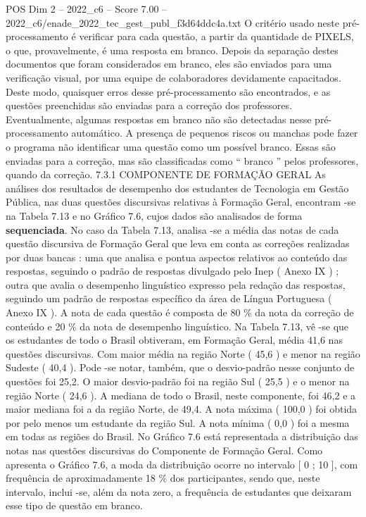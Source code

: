 \begin{textsample}{POS Dim 2 – 2022\_c6 – Score 7.00 – 2022\_c6/enade\_2022\_tec\_gest\_publ\_f3d64ddc4a.txt}
O critério usado neste pré-processamento é verificar para cada questão, a partir da quantidade de PIXELS, o que, provavelmente, é uma resposta em branco.
Depois da separação destes documentos que foram considerados em branco, eles são enviados para uma verificação visual, por uma equipe de colaboradores devidamente capacitados.
Deste modo, quaisquer erros desse pré-processamento são encontrados, e as questões preenchidas são enviadas para a correção dos professores.
Eventualmente, algumas respostas em branco não são detectadas nesse pré-processamento automático.
A presença de pequenos riscos ou manchas pode fazer o programa não identificar uma questão como um possível branco.
Essas são enviadas para a correção, mas são classificadas como “ branco ” pelos professores, quando da correção. 7.3.1 COMPONENTE DE FORMAÇÃO GERAL As análises dos resultados de desempenho dos estudantes de Tecnologia em Gestão Pública, nas duas questões discursivas relativas à Formação Geral, encontram -se na Tabela 7.13 e no Gráfico 7.6, cujos dados são analisados de forma \textbf{sequenciada}.
No caso da Tabela 7.13, analisa -se a média das notas de cada questão discursiva de Formação Geral que leva em conta as correções realizadas por duas bancas : uma que analisa e pontua aspectos relativos ao conteúdo das respostas, seguindo o padrão de respostas divulgado pelo Inep ( Anexo IX ) ; outra que avalia o desempenho linguístico expresso pela redação das respostas, seguindo um padrão de respostas específico da área de Língua Portuguesa ( Anexo IX ).
A nota de cada questão é composta de 80 \% da nota da correção de conteúdo e 20 \% da nota de desempenho linguístico.
Na Tabela 7.13, vê -se que os estudantes de todo o Brasil obtiveram, em Formação Geral, média 41,6 nas questões discursivas.
Com maior média na região Norte ( 45,6 ) e menor na região Sudeste ( 40,4 ).
Pode -se notar, também, que o desvio-padrão nesse conjunto de questões foi 25,2.
O maior desvio-padrão foi na região Sul ( 25,5 ) e o menor na região Norte ( 24,6 ).
A mediana de todo o Brasil, neste componente, foi 46,2 e a maior mediana foi a da região Norte, de 49,4.
A nota máxima ( 100,0 ) foi obtida por pelo menos um estudante da região Sul.
A nota mínima ( 0,0 ) foi a mesma em todas as regiões do Brasil.
No Gráfico 7.6 está representada a distribuição das notas nas questões discursivas do Componente de Formação Geral.
Como apresenta o Gráfico 7.6, a moda da distribuição ocorre no intervalo [ 0 ; 10 ], com frequência de aproximadamente 18 \% dos participantes, sendo que, neste intervalo, inclui -se, além da nota zero, a frequência de estudantes que deixaram esse tipo de questão em branco.

\end{textsample}
